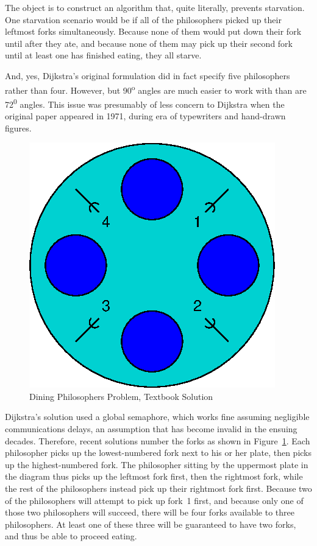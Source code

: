 The object is to construct an algorithm that, quite literally,
prevents starvation.
One starvation scenario would be if all of the philosophers picked up 
their leftmost forks simultaneously.
Because none of them would put down their fork until after they ate,
and because none of them may pick up their second fork until at least
one has finished eating, they all starve.

And, yes, Dijkstra's original formulation did in fact specify five
philosophers rather than four.
However, but 90\textsuperscript{o} angles are much
easier to work with than are 72\textsuperscript{0} angles.
This issue was presumably of less concern to Dijkstra when the
original paper appeared in 1971, during
era of typewriters and hand-drawn figures.

\begin{figure}[tb]
\begin{center}
\includegraphics{SMPdesign/DiningPhilosopher4TB}
\end{center}
\caption{Dining Philosophers Problem, Textbook Solution}
\label{fig:SMPdesign:Dining Philosophers Problem, Textbook Solution}
\end{figure}

Dijkstra's solution used a global semaphore, which works fine assuming
negligible communications delays, an assumption that has become invalid
in the ensuing decades.
Therefore, recent solutions number the forks as shown in
Figure~\ref{fig:SMPdesign:Dining Philosophers Problem, Textbook Solution}.
Each philosopher picks up the lowest-numbered fork next to his or her
plate, then picks up the highest-numbered fork.
The philosopher sitting by the uppermost plate in the diagram thus
picks up the leftmost fork first, then the rightmost fork, while the
rest of the philosophers instead pick up their rightmost fork first.
Because two of the philosophers will attempt to pick up fork~1 first,
and because only one of those two philosophers will succeed,
there will be four forks available to three philosophers.
At least one of these three will be guaranteed to have two forks,
and thus be able to proceed eating.


